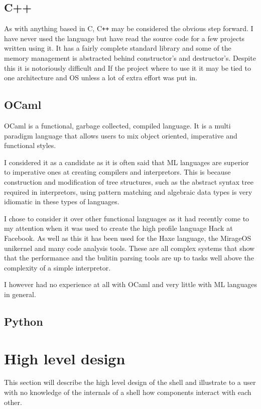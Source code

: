 \subsection{C++}


As with anything based in C, C\verb!++! may be considered the obvious step forward.
I have never used the language but have read the source code for a few projects written using it.
It has a fairly complete standard library and some of the memory management is abstracted behind constructor's and destructor's.
Despite this it is notoriously difficult and If the project where to use it it may be tied to one architecture and OS unless a lot of extra effort was put in.

\subsection{OCaml}
OCaml is a functional, garbage collected, compiled language.
It is a multi paradigm language that allows users to mix object oriented, imperative and functional styles.

I considered it as a candidate as it is often said that ML languages are superior to imperative ones at creating compilers and interpretors. 
This is because construction and modification of tree structures, such as the abstract syntax tree required in interpretors, using pattern matching and algebraic data types is very idiomatic in these types of languages.

I chose to consider it over other functional languages as it had recently come to my attention when it was used to create the high profile language Hack at Facebook.
As well as this it has been used for the Haxe language, the MirageOS unikernel and many code analysis tools.
These are all complex systems that show that the performance and the bulitin parsing tools are up to tasks well above the complexity of a simple interpretor.

I however had no experience at all with OCaml and very little with ML languages in general.



\subsection{Python}



\section{High level design}
This section will describe the high level design of the shell and illustrate to a user with no knowledge of the internals of a shell how components interact with each other.

